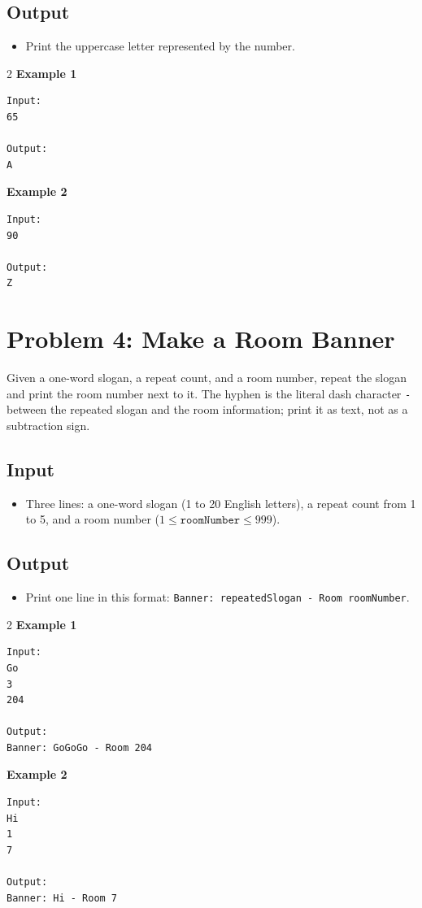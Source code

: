 \documentclass[12pt,oneside,openany]{article}
\begin{document}
\subsection*{Output}
\begin{itemize}
    \item Print the uppercase letter represented by the number.
\end{itemize}

\vspace{0.2cm}

\begin{example*}{}{}
\begin{multicols}{2}
\textbf{Example 1}
\begin{verbatim}
Input:
65

Output:
A
\end{verbatim}
\textbf{Example 2}
\begin{verbatim}
Input:
90

Output:
Z
\end{verbatim}
\end{multicols}
\end{example*}
\newpage
\section*{Problem 4: Make a Room Banner}

Given a one-word slogan, a repeat count, and a room number, repeat the slogan and print the room number next to it. The hyphen is the literal dash character \texttt{-} between the repeated slogan and the room information; print it as text, not as a subtraction sign.

\subsection*{Input}
\begin{itemize}
    \item Three lines: a one-word slogan (1 to 20 English letters), a repeat count from 1 to 5, and a room number ($1 \leq \texttt{roomNumber} \leq 999$).
\end{itemize}

\subsection*{Output}
\begin{itemize}
    \item Print one line in this format: \texttt{Banner: repeatedSlogan - Room roomNumber}.
\end{itemize}

\vspace{0.2cm}

\begin{example*}{}{}
\begin{multicols}{2}
\textbf{Example 1}
\begin{verbatim}
Input:
Go
3
204

Output:
Banner: GoGoGo - Room 204
\end{verbatim}
\textbf{Example 2}
\begin{verbatim}
Input:
Hi
1
7

Output:
Banner: Hi - Room 7
\end{verbatim}
\end{multicols}
\end{example*}
\end{document}
